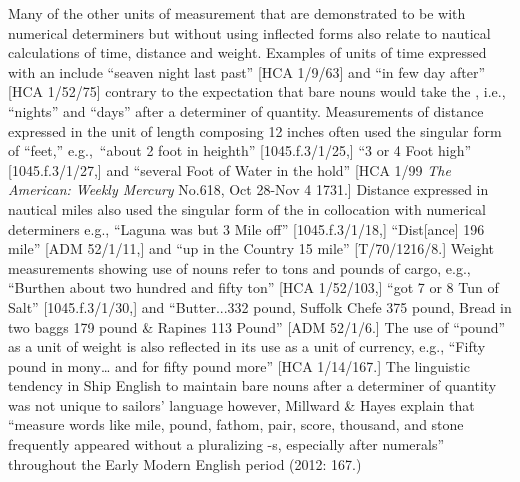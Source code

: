 Many of the other units of measurement that are demonstrated to be  with numerical determiners but without using inflected  forms also relate to nautical calculations of time, distance and weight. Examples of units of time expressed with an   include “seaven night last past” [HCA 1/9/63] and “in few day after” [HCA 1/52/75] contrary to the expectation that bare nouns would take the , i.e., “nights” and “days” after a determiner of quantity. Measurements of distance expressed in the unit of length composing 12 inches often used the singular form of “feet,” e.g.,~“about 2 foot in heighth” [1045.f.3/1/25,] “3 or 4 Foot high” [1045.f.3/1/27,] and “several Foot of Water in the hold” [HCA 1/99 \textit{The American: Weekly Mercury} No.618, Oct 28-Nov 4 1731.] Distance expressed in nautical miles also used the singular form of the  in collocation with numerical determiners e.g., “Laguna was but 3 Mile off” [1045.f.3/1/18,] “Dist[ance] 196 mile” [ADM 52/1/11,] and “up in the Country 15 mile” [T/70/1216/8.] Weight measurements showing use of  nouns refer to tons and pounds of cargo, e.g., “Burthen about two hundred and fifty ton” [HCA 1/52/103,] “got 7 or 8 Tun of Salt” [1045.f.3/1/30,] and “Butter...332 pound, Suffolk Chefe 375 pound, Bread in two baggs 179 pound \& Rapines 113 Pound” [ADM 52/1/6.] The use of  “pound” as a unit of weight is also reflected in its use as a unit of currency, e.g., “Fifty pound in mony… and for fifty pound more” [HCA 1/14/167.] The linguistic tendency in Ship English to maintain  bare nouns after a determiner of quantity was not unique to sailors’ language however, Millward \& Hayes explain that “measure words like mile, pound, fathom, pair, score, thousand, and stone frequently appeared without a pluralizing -s, especially after numerals” throughout the Early Modern English period (2012: 167.)

